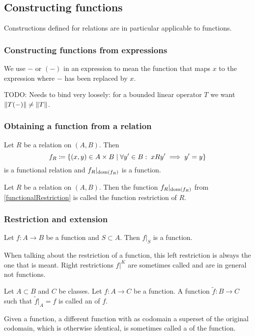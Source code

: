 \subsection{Constructing functions}
Constructions defined for relations are in particular applicable to functions.

\subsubsection{Constructing functions from expressions}
\begin{definition}
We use $-$ or $(-)$ in an expression to mean the function that maps $x$ to the expression where $-$ has been replaced by $x$.
\end{definition}
TODO: Needs to bind very loosely: for a bounded linear operator $T$ we want $\lVert T(-)\rVert \neq \lVert T\rVert$.

\subsubsection{Obtaining a function from a relation}
\begin{lemma} \label{functionalRestriction}
Let $R$ be a relation on $(A,B)$. Then
\[ f_R \defeq \setbuilder{(x,y)\in A\times B}{\forall y'\in B:\; xRy' \implies y'= y } \]
is a functional relation and $f_R|_{\operatorname{dom}(f_R)}$ is a function.
\end{lemma}

\begin{definition}
Let $R$ be a relation on $(A,B)$. Then the function $f_R|_{\operatorname{dom}(f_R)}$ from \ref{functionalRestriction} is called the function restriction of $R$.
\end{definition}

\subsubsection{Restriction and extension}
\begin{lemma}
Let $f: A\to B$ be a function and $S\subset A$. Then $f|_S$ is a function.
\end{lemma}
When talking about the restriction of a function, this left restriction is always the one that is meant. Right restrictions $f|^K$ are sometimes called  and are in general not functions.

\begin{definition}
Let $A\subset B$ and $C$ be classes. Let $f: A\to C$ be a function. A function $\tilde{f}: B\to C$ such that $\tilde{f}|_A = f$ is called an  of $f$.
\end{definition}
Given a function, a different function with as codomain a superset of the original codomain, which is otherwise identical, is sometimes called a  of the function.

